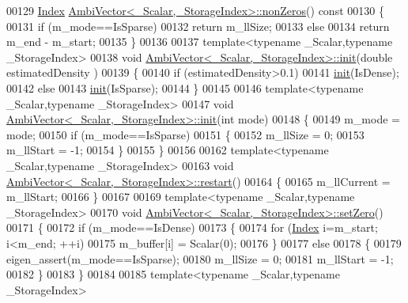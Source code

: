\begin{DoxyCode}
00129 \hyperlink{namespace_eigen_a62e77e0933482dafde8fe197d9a2cfde}{Index} \hyperlink{class_eigen_1_1internal_1_1_ambi_vector_ae0b137e95f52dea2320c16c379d27e74}{AmbiVector<\_Scalar,\_StorageIndex>::nonZeros}()\textcolor{keyword}{ const}
00130 \textcolor{keyword}{}\{
00131   \textcolor{keywordflow}{if} (m\_mode==IsSparse)
00132     \textcolor{keywordflow}{return} m\_llSize;
00133   \textcolor{keywordflow}{else}
00134     \textcolor{keywordflow}{return} m\_end - m\_start;
00135 \}
00136 
00137 \textcolor{keyword}{template}<\textcolor{keyword}{typename} \_Scalar,\textcolor{keyword}{typename} \_StorageIndex>
00138 \textcolor{keywordtype}{void} \hyperlink{class_eigen_1_1internal_1_1_ambi_vector}{AmbiVector<\_Scalar,\_StorageIndex>::init}(\textcolor{keywordtype}{double} estimatedDensity
      )
00139 \{
00140   \textcolor{keywordflow}{if} (estimatedDensity>0.1)
00141     \hyperlink{structinit}{init}(IsDense);
00142   \textcolor{keywordflow}{else}
00143     \hyperlink{structinit}{init}(IsSparse);
00144 \}
00145 
00146 \textcolor{keyword}{template}<\textcolor{keyword}{typename} \_Scalar,\textcolor{keyword}{typename} \_StorageIndex>
00147 \textcolor{keywordtype}{void} \hyperlink{class_eigen_1_1internal_1_1_ambi_vector}{AmbiVector<\_Scalar,\_StorageIndex>::init}(\textcolor{keywordtype}{int} mode)
00148 \{
00149   m\_mode = mode;
00150   \textcolor{keywordflow}{if} (m\_mode==IsSparse)
00151   \{
00152     m\_llSize = 0;
00153     m\_llStart = -1;
00154   \}
00155 \}
00156 
00162 \textcolor{keyword}{template}<\textcolor{keyword}{typename} \_Scalar,\textcolor{keyword}{typename} \_StorageIndex>
00163 \textcolor{keywordtype}{void} \hyperlink{class_eigen_1_1internal_1_1_ambi_vector_a518fc22cdfa37e5340350e2a69fa8f1a}{AmbiVector<\_Scalar,\_StorageIndex>::restart}()
00164 \{
00165   m\_llCurrent = m\_llStart;
00166 \}
00167 
00169 \textcolor{keyword}{template}<\textcolor{keyword}{typename} \_Scalar,\textcolor{keyword}{typename} \_StorageIndex>
00170 \textcolor{keywordtype}{void} \hyperlink{class_eigen_1_1internal_1_1_ambi_vector_af472b476758307bcc1621d9eb4018f6a}{AmbiVector<\_Scalar,\_StorageIndex>::setZero}()
00171 \{
00172   \textcolor{keywordflow}{if} (m\_mode==IsDense)
00173   \{
00174     \textcolor{keywordflow}{for} (\hyperlink{namespace_eigen_a62e77e0933482dafde8fe197d9a2cfde}{Index} i=m\_start; i<m\_end; ++i)
00175       m\_buffer[i] = Scalar(0);
00176   \}
00177   \textcolor{keywordflow}{else}
00178   \{
00179     eigen\_assert(m\_mode==IsSparse);
00180     m\_llSize = 0;
00181     m\_llStart = -1;
00182   \}
00183 \}
00184 
00185 \textcolor{keyword}{template}<\textcolor{keyword}{typename} \_Scalar,\textcolor{keyword}{typename} \_StorageIndex>

\end{DoxyCode}
